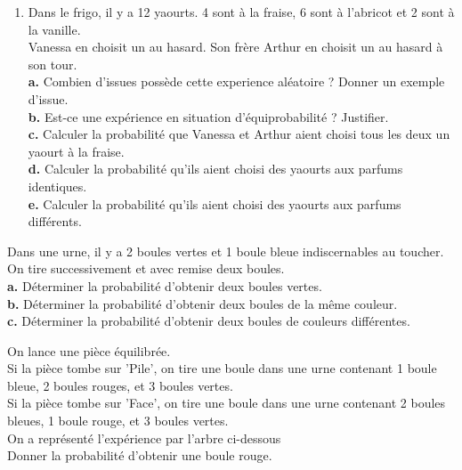 {\begin{Exercice}
\begin{enumerate}[itemsep=2em]
	\item \begin{minipage}[t]{\linewidth}Dans le frigo, il y a 12 yaourts. 4 sont à la fraise, 6 sont à l'abricot et 2 sont à la vanille.\\Vanessa en choisit un au hasard. Son frère Arthur en choisit un au hasard à son tour.\\\textbf {a.}  Combien d'issues possède cette experience aléatoire ? Donner un exemple d'issue.\\\textbf {b.}  Est-ce une expérience en situation d'équiprobabilité ? Justifier.\\\textbf {c.}  Calculer la probabilité que Vanessa et Arthur aient choisi tous les deux un yaourt à la fraise.\\\textbf {d.}  Calculer la probabilité qu'ils aient choisi des yaourts aux parfums identiques.\\\textbf {e.}  Calculer la probabilité qu'ils aient choisi des yaourts aux parfums différents.\\\end{minipage}
\end{enumerate}
\end{Exercice}



\begin{Exercice}
Dans une urne, il y a 2 boules vertes et 1 boule bleue indiscernables au toucher.\\On tire successivement et avec remise deux boules.\\\textbf {a.}  Déterminer la probabilité d'obtenir deux boules vertes.\\\textbf {b.}  Déterminer la probabilité d'obtenir deux boules de la même couleur.\\\textbf {c.}  Déterminer la probabilité d'obtenir deux boules de couleurs différentes.
\end{Exercice}

\begin{Exercice}
 \begin{minipage}[c]{0.5\linewidth}
 On lance une pièce équilibrée.\\Si la pièce tombe sur 'Pile', on tire une boule dans une urne contenant 1 boule bleue, 2 boules rouges,  et 3 boules vertes.\\Si la pièce tombe sur 'Face', on tire une boule dans une urne contenant 2 boules bleues, 1 boule rouge,  et 3 boules vertes.\\On a représenté l'expérience par l'arbre ci-dessous\\Donner la probabilité d'obtenir une boule rouge.\end{minipage}
\begin{minipage}[c]{0.45\linewidth}
\begin{center}
\begin{tikzpicture}[baseline,scale = 0.45]


\end{tikzpicture}
\end{center}
\end{minipage}
\end{Exercice}}
